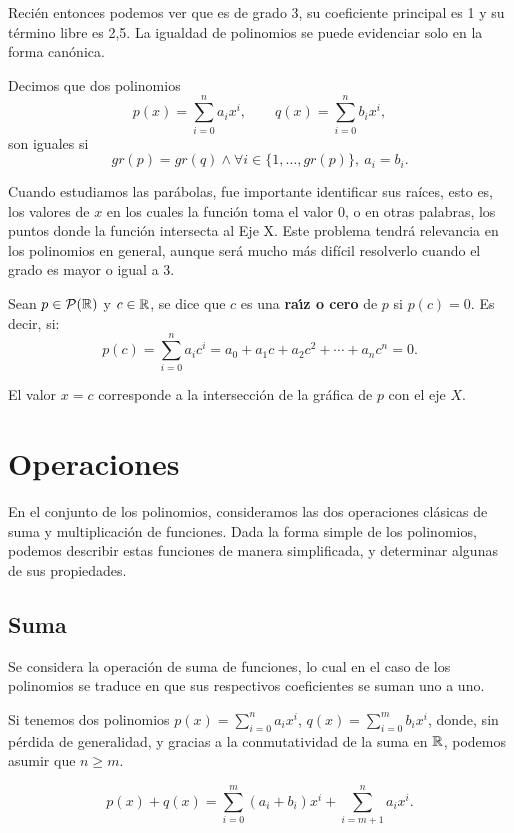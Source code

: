  Recién entonces podemos ver que es de grado 3, su coeficiente principal es 1 y su término libre es 2,5.
 La igualdad de polinomios se puede evidenciar solo en la forma canónica.
 


\bigskip

\begin{defn}
Decimos que dos polinomios 
$$p(x)=\sum_{i=0}^n a_ix^i,\qquad q(x)=\sum_{i=0}^n b_ix^i, $$
son iguales si 
$$ gr(p)=gr(q) \wedge \forall i\in\{1,\dots,gr(p)\},\ a_i=b_i.$$
\end{defn}

Cuando estudiamos las parábolas, fue importante identificar sus raíces, esto es, los valores de $x$ en los cuales la función toma el valor 0, o en otras palabras, los puntos donde la función intersecta al Eje X.
Este problema tendrá relevancia en los polinomios en general, aunque será mucho más difícil resolverlo cuando el grado es mayor o igual a 3.

\medskip

\begin{defn}
Sean  $p \in \mathcal{P}(\mathbb{R})$ y $c\in \mathbb{R}$, se dice que   $c$ es  una {  {\bf ra{\'\i}z o cero}}  de  $p$ si $p(c)=0$. Es decir, si:
$$p(c)=\sum_{i=0}^n a_ic^i=a_0+a_1c+a_2c^2+\cdots +a_nc^n=0.$$
\end{defn}

El valor $x=c$ corresponde a la intersecci\'on de la gr\'afica de $p$ con el eje $X$.


\section{Operaciones}

En el conjunto de los polinomios, consideramos las dos operaciones clásicas de suma y multiplicación de funciones. 
Dada la forma simple de los polinomios, podemos describir estas funciones de manera simplificada, y determinar algunas de sus propiedades.

\subsection{Suma}

Se considera la operación de suma de funciones, lo cual en el caso de los polinomios se traduce en que sus respectivos coeficientes se suman uno a uno.

\medskip

\begin{defn}
 Si tenemos dos polinomios $p(x)=\sum_{i=0}^n a_ix^i$, $q(x)=\sum_{i=0}^m b_ix^i $, donde, sin pérdida de generalidad, y gracias a la conmutatividad de la suma en $\mathbb{R}$, podemos asumir que $n\ge m$.

$$p(x)+q(x)=\sum_{i=0}^{m} (a_i+b_i)x^i+\sum_{i=m+1}^n a_ix^i. $$
\end{defn}

